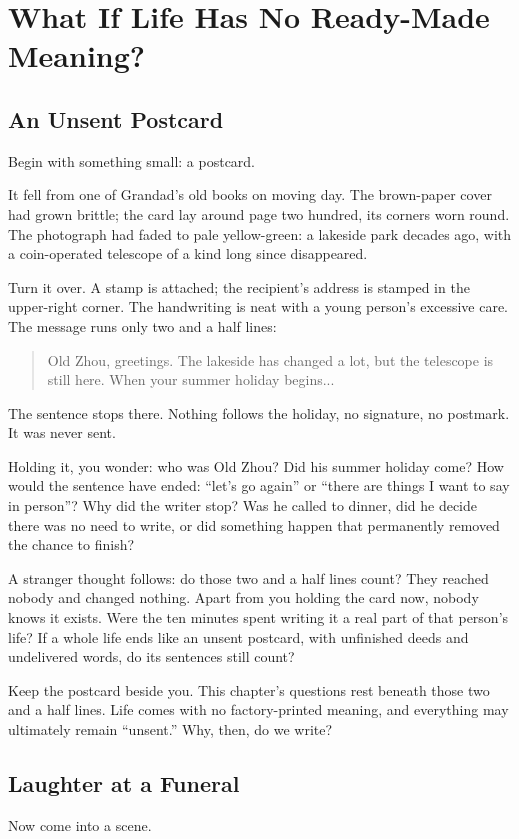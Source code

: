 \chapter[Life without Ready-Made Meaning]{What If Life Has No Ready-Made Meaning?}
\section{An Unsent Postcard}
Begin with something small: a postcard.

It fell from one of Grandad's old books on moving day. The brown-paper cover had grown brittle; the card lay around page two hundred, its corners worn round. The photograph had faded to pale yellow-green: a lakeside park decades ago, with a coin-operated telescope of a kind long since disappeared.

Turn it over. A stamp is attached; the recipient's address is stamped in the upper-right corner. The handwriting is neat with a young person's excessive care. The message runs only two and a half lines:

\begin{quote}
Old Zhou, greetings. The lakeside has changed a lot, but the telescope is still here. When your summer holiday begins...
\end{quote}
The sentence stops there. Nothing follows the holiday, no signature, no postmark. It was never sent.

Holding it, you wonder: who was Old Zhou? Did his summer holiday come? How would the sentence have ended: ``let's go again'' or ``there are things I want to say in person''? Why did the writer stop? Was he called to dinner, did he decide there was no need to write, or did something happen that permanently removed the chance to finish?

A stranger thought follows: do those two and a half lines count? They reached nobody and changed nothing. Apart from you holding the card now, nobody knows it exists. Were the ten minutes spent writing it a real part of that person's life? If a whole life ends like an unsent postcard, with unfinished deeds and undelivered words, do its sentences still count?

Keep the postcard beside you. This chapter's questions rest beneath those two and a half lines. Life comes with no factory-printed meaning, and everything may ultimately remain ``unsent.'' Why, then, do we write?

\section{Laughter at a Funeral}
Now come into a scene.

